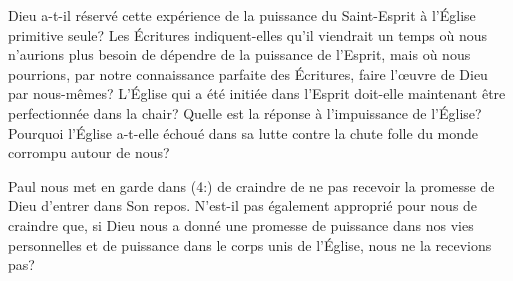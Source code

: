 Dieu a-t-il réservé cette expérience de la puissance du Saint-Esprit à l'Église primitive seule? Les Écritures indiquent-elles qu'il viendrait un temps où nous n'aurions plus besoin de dépendre de la puissance de l'Esprit, mais où nous pourrions, par notre connaissance parfaite des Écritures, faire l'œuvre de Dieu par nous-mêmes? L'Église qui a été initiée dans l'Esprit doit-elle maintenant être perfectionnée dans la chair? Quelle est la réponse à l'impuissance de l'Église? Pourquoi l'Église a-t-elle échoué dans sa lutte contre la chute folle du monde corrompu autour de nous?

Paul nous met en garde dans (4:) de craindre de ne pas recevoir la promesse de Dieu d'entrer dans Son repos. N'est-il pas également approprié pour nous de craindre que, si Dieu nous a donné une promesse de puissance dans nos vies personnelles et de puissance dans le corps unis de l'Église, nous ne la recevions pas?


